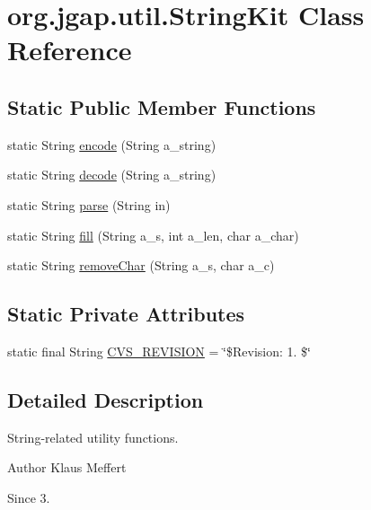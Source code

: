 \hypertarget{classorg_1_1jgap_1_1util_1_1_string_kit}{\section{org.\-jgap.\-util.\-String\-Kit Class Reference}
\label{classorg_1_1jgap_1_1util_1_1_string_kit}
}
\subsection*{Static Public Member Functions}
\begin{DoxyCompactItemize}
\item 
static String \hyperlink{classorg_1_1jgap_1_1util_1_1_string_kit_a6031e0a30b88089d34b8beb95be53710}{encode} (String a\-\_\-string)
\item 
static String \hyperlink{classorg_1_1jgap_1_1util_1_1_string_kit_a7b8c5ea71d7c37e329b493cd2ea0625b}{decode} (String a\-\_\-string)
\item 
static String \hyperlink{classorg_1_1jgap_1_1util_1_1_string_kit_ab832df653918769b6fac281e039fa4ed}{parse} (String in)
\item 
static String \hyperlink{classorg_1_1jgap_1_1util_1_1_string_kit_a11f47c2579e3815b5d78e9a93595d111}{fill} (String a\-\_\-s, int a\-\_\-len, char a\-\_\-char)
\item 
static String \hyperlink{classorg_1_1jgap_1_1util_1_1_string_kit_a61d405989c392d72483b83dc810ac02e}{remove\-Char} (String a\-\_\-s, char a\-\_\-c)
\end{DoxyCompactItemize}
\subsection*{Static Private Attributes}
\begin{DoxyCompactItemize}
\item 
static final String \hyperlink{classorg_1_1jgap_1_1util_1_1_string_kit_abaf88274cdc5d49fdfaa087d1bfa1e51}{C\-V\-S\-\_\-\-R\-E\-V\-I\-S\-I\-O\-N} = \char`\"{}\$Revision\-: 1. \$\char`\"{}
\end{DoxyCompactItemize}


\subsection{Detailed Description}
String-\/related utility functions.

\begin{DoxyAuthor}{Author}
Klaus Meffert 
\end{DoxyAuthor}
\begin{DoxySince}{Since}
3. 
\end{DoxySince}


